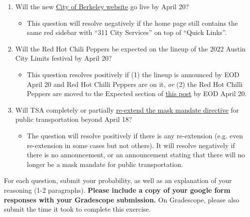 \documentclass[11pt]{article}
\begin{document}
\begin{enumerate}
	\item Will the new \href{https://www.cityofberkeley.info/Home.aspx}{City of Berkeley website} go live by April 20?
	\begin{itemize}
		\item This question will resolve negatively if the home page still contains the same red sidebar with ``311 City Services'' on top of ``Quick Links''.
	\end{itemize} 
	\item Will the Red Hot Chili Peppers be expected on the lineup of the 2022 Austin City Limits festival by April 20?
	\begin{itemize}
		\item This question resolves positively if (1) the lineup is announced by EOD April 20 and Red Hot Chilli Peppers are on it, \emph{or} (2) the Red Hot Chilli Peppers are moved to the Expected section of \href{https://www.reddit.com/r/aclfestival/comments/s6izhl/official_acl_2022_lineup_speculation_thread/}{this post} by EOD April 20.
	\end{itemize}
	\item Will TSA completely or partially \href{https://www.tsa.gov/news/press/statements/2022/03/10/statement-regarding-face-mask-use-public-transportation}{re-extend the mask mandate directive} for public transportation beyond April 18?
	\begin{itemize}
		\item The question will resolve positively if there is any re-extension (e.g. even re-extension in some cases but not others). It will resolve negatively if there is no announcement, or an announcement stating that there will no longer be a mask mandate for public transportation.
	\end{itemize}
\end{enumerate}

For each question, submit your probability, as well as an explanation of your reasoning (1-2 paragraphs). \textbf{Please include a copy of your google form responses with your Gradescope submission.} On Gradescope, please also submit the time it took to complete this exercise.
\end{document}
